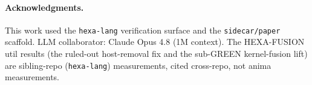 \documentclass[11pt,a4paper]{article}
\begin{document}
\paragraph{Acknowledgments.} This work used the \texttt{hexa-lang} verification
surface and the \texttt{sidecar/paper} scaffold. LLM collaborator: Claude Opus 4.8
(1M context). The HEXA-FUSION util results (the ruled-out host-removal fix and the
sub-GREEN kernel-fusion lift) are sibling-repo (\texttt{hexa-lang}) measurements,
cited cross-repo, not anima measurements.
\end{document}
